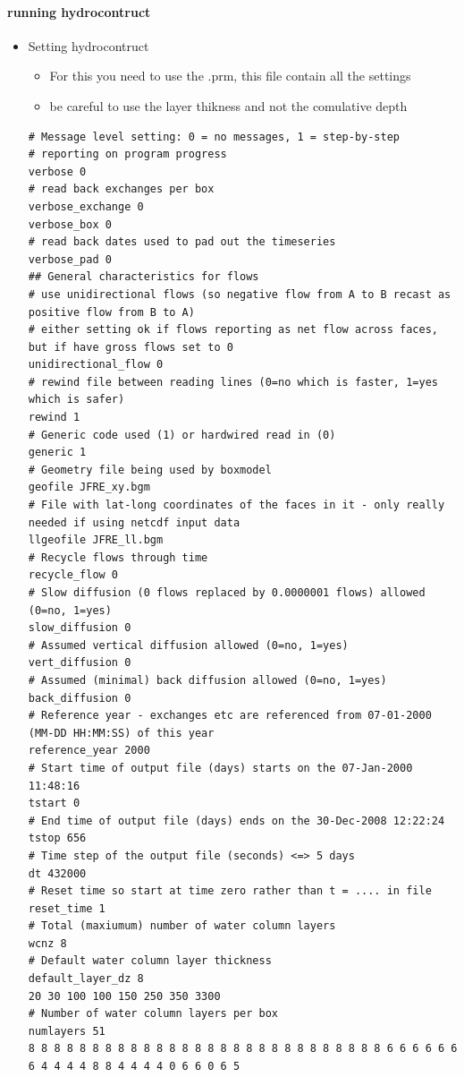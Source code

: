 \documentclass[11pt]{article}
\begin{document}
\paragraph*{running hydrocontruct}
\label{sec-4-4-1-2}
\begin{itemize}

\item Setting hydrocontruct
\label{sec-4-4-1-2-1}%
\begin{itemize}
\item For this you need to use the .prm, this file contain all the settings
\item be careful to use the layer thikness and not the comulative depth
\end{itemize}

\begin{verbatim}
# Message level setting: 0 = no messages, 1 = step-by-step
# reporting on program progress
verbose 0
# read back exchanges per box
verbose_exchange 0
verbose_box 0
# read back dates used to pad out the timeseries
verbose_pad 0
## General characteristics for flows
# use unidirectional flows (so negative flow from A to B recast as positive flow from B to A)
# either setting ok if flows reporting as net flow across faces, but if have gross flows set to 0
unidirectional_flow 0
# rewind file between reading lines (0=no which is faster, 1=yes which is safer)
rewind 1
# Generic code used (1) or hardwired read in (0)
generic 1
# Geometry file being used by boxmodel
geofile JFRE_xy.bgm
# File with lat-long coordinates of the faces in it - only really needed if using netcdf input data
llgeofile JFRE_ll.bgm
# Recycle flows through time
recycle_flow 0
# Slow diffusion (0 flows replaced by 0.0000001 flows) allowed (0=no, 1=yes)
slow_diffusion 0
# Assumed vertical diffusion allowed (0=no, 1=yes)
vert_diffusion 0
# Assumed (minimal) back diffusion allowed (0=no, 1=yes)
back_diffusion 0
# Reference year - exchanges etc are referenced from 07-01-2000 (MM-DD HH:MM:SS) of this year
reference_year 2000
# Start time of output file (days) starts on the 07-Jan-2000 11:48:16
tstart 0
# End time of output file (days) ends on the 30-Dec-2008 12:22:24
tstop 656
# Time step of the output file (seconds) <=> 5 days
dt 432000
# Reset time so start at time zero rather than t = .... in file
reset_time 1
# Total (maxiumum) number of water column layers
wcnz 8
# Default water column layer thickness
default_layer_dz 8
20 30 100 100 150 250 350 3300
# Number of water column layers per box
numlayers 51
8 8 8 8 8 8 8 8 8 8 8 8 8 8 8 8 8 8 8 8 8 8 8 8 8 8 8 8 6 6 6 6 6 6 6 4 4 4 4 8 8 4 4 4 4 0 6 6 0 6 5

\end{verbatim}
\end{itemize}
\end{document}
